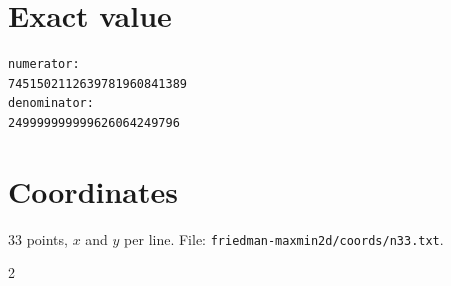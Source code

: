 \documentclass[11pt,a4paper]{article}
\begin{document}
\appendix
\section{Exact value}
{\small
\begin{verbatim}
numerator:
7451502112639781960841389
denominator:
249999999999626064249796
\end{verbatim}}

\section{Coordinates}
33 points, $x$ and $y$ per line. File: \texttt{friedman-maxmin2d/coords/n33.txt}.
{\tiny
\begin{multicols}{2}
\end{multicols}}
\end{document}
